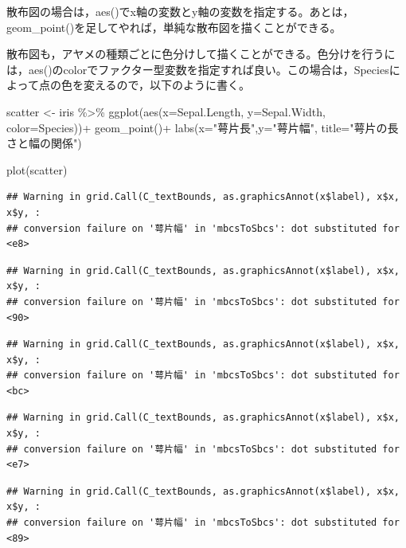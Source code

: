 \documentclass[
]{book}
\newenvironment{Shaded}{\begin{snugshade}}{\end{snugshade}}
\newcommand{\AttributeTok}[1]{\textcolor[rgb]{0.77,0.63,0.00}{#1}}
\newcommand{\FunctionTok}[1]{\textcolor[rgb]{0.00,0.00,0.00}{#1}}
\newcommand{\NormalTok}[1]{#1}
\newcommand{\OtherTok}[1]{\textcolor[rgb]{0.56,0.35,0.01}{#1}}
\newcommand{\SpecialCharTok}[1]{\textcolor[rgb]{0.00,0.00,0.00}{#1}}
\newcommand{\StringTok}[1]{\textcolor[rgb]{0.31,0.60,0.02}{#1}}
\begin{document}
散布図の場合は，aes()でx軸の変数とy軸の変数を指定する。あとは，geom\_point()を足してやれば，単純な散布図を描くことができる。

散布図も，アヤメの種類ごとに色分けして描くことができる。色分けを行うには，aes()のcolorでファクター型変数を指定すれば良い。この場合は，Speciesによって点の色を変えるので，以下のように書く。

\begin{Shaded}
\begin{Highlighting}[]
\NormalTok{scatter }\OtherTok{\textless{}{-}}\NormalTok{ iris }\SpecialCharTok{\%\textgreater{}\%} 
  \FunctionTok{ggplot}\NormalTok{(}\FunctionTok{aes}\NormalTok{(}\AttributeTok{x=}\NormalTok{Sepal.Length, }\AttributeTok{y=}\NormalTok{Sepal.Width, }\AttributeTok{color=}\NormalTok{Species))}\SpecialCharTok{+}
  \FunctionTok{geom\_point}\NormalTok{()}\SpecialCharTok{+}
  \FunctionTok{labs}\NormalTok{(}\AttributeTok{x=}\StringTok{"萼片長"}\NormalTok{,}\AttributeTok{y=}\StringTok{"萼片幅"}\NormalTok{, }\AttributeTok{title=}\StringTok{"萼片の長さと幅の関係"}\NormalTok{)}

\FunctionTok{plot}\NormalTok{(scatter)}
\end{Highlighting}
\end{Shaded}

\begin{verbatim}
## Warning in grid.Call(C_textBounds, as.graphicsAnnot(x$label), x$x, x$y, :
## conversion failure on '萼片幅' in 'mbcsToSbcs': dot substituted for <e8>
\end{verbatim}

\begin{verbatim}
## Warning in grid.Call(C_textBounds, as.graphicsAnnot(x$label), x$x, x$y, :
## conversion failure on '萼片幅' in 'mbcsToSbcs': dot substituted for <90>
\end{verbatim}

\begin{verbatim}
## Warning in grid.Call(C_textBounds, as.graphicsAnnot(x$label), x$x, x$y, :
## conversion failure on '萼片幅' in 'mbcsToSbcs': dot substituted for <bc>
\end{verbatim}

\begin{verbatim}
## Warning in grid.Call(C_textBounds, as.graphicsAnnot(x$label), x$x, x$y, :
## conversion failure on '萼片幅' in 'mbcsToSbcs': dot substituted for <e7>
\end{verbatim}

\begin{verbatim}
## Warning in grid.Call(C_textBounds, as.graphicsAnnot(x$label), x$x, x$y, :
## conversion failure on '萼片幅' in 'mbcsToSbcs': dot substituted for <89>
\end{verbatim}
\end{document}
